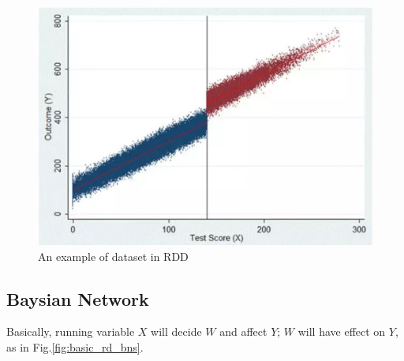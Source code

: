 \documentclass[a4 paper,12pt]{article}
\begin{document}
\begin{figure}[h]
	\centering
   \includegraphics[scale=1]{RDDintro.jpg}
   \caption{An example of dataset in RDD}
   \label{fig:rddintro}
\end{figure}

\subsection{Baysian Network}

Basically, running variable $X$ will decide $W$ and affect $Y$; $W$ will have effect on $Y$, as in Fig.\ref{fig:basic_rd_bns}.
\end{document}
